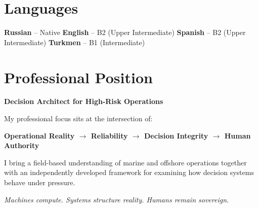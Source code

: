\documentclass[11pt,a4paper]{article}
\begin{document}
\section*{Languages}

\textbf{Russian} -- Native \quad\textbar\quad
\textbf{English} -- B2 (Upper Intermediate) \quad\textbar\quad
\textbf{Spanish} -- B2 (Upper Intermediate) \quad\textbar\quad
\textbf{Turkmen} -- B1 (Intermediate)

\section*{Professional Position}

\textbf{\color{avcsdark}Decision Architect for High-Risk Operations}

\vspace{2pt}
My professional focus sits at the intersection of:

\begin{center}
\textbf{Operational Reality $\rightarrow$ Reliability $\rightarrow$ Decision Integrity $\rightarrow$ Human Authority}
\end{center}

I bring a field-based understanding of marine and offshore operations together with an independently developed framework for examining how decision systems behave under pressure.

\vspace{4pt}
\begin{center}
\textit{Machines compute. Systems structure reality. Humans remain sovereign.}
\end{center}
\end{document}
